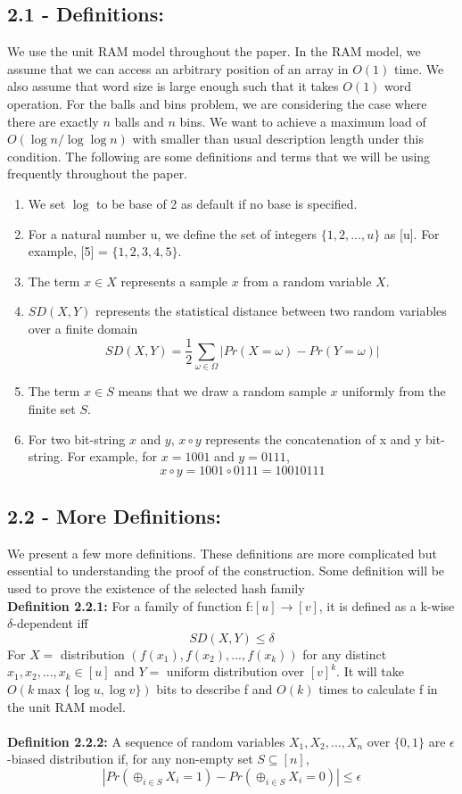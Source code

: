 \documentclass[a4paper, english]{paper}
\begin{document}
	\subsection{2.1 - Definitions:}
\quad	We use the unit RAM model throughout the paper. In the RAM model, we assume that we can access an arbitrary position of an array in $O(1)$ time. We also assume that word size is large enough such that it takes $O(1)$ word operation. For the balls and bins problem, we are considering the case where there are exactly $n$ balls and $n$ bins. We want to achieve a maximum load of $O(\log n/ \log \log n)$ with smaller than usual description length under this condition. The following are some definitions and terms that we will be using frequently throughout the paper.
	\begin{enumerate}
	\item We set $\log$ to be base of 2 as default if no base is specified. 
	\item For a natural number u, we define the set of integers $\{1, 2, ..., u\}$ as [u].  For example, [5] = $\{1,2,3,4,5\}$.
	\item The term $x \in X$ represents a sample $x$ from a random variable $X$.
	\item  $SD(X, Y)$ represents the statistical distance between two random variables over a finite domain
		$$SD(X, Y) = \frac{1}{2}\sum_{\omega\in \Omega}| Pr(X= \omega) - Pr(Y= \omega)|$$
	\item The term $x \in S$ means that we draw a random sample $x$ uniformly from the finite set $S$.
	\item For two bit-string $x$ and $y$, $x \circ y$ represents the concatenation of x and y bit-string. For example, for $x = 1001$ and $y = 0111$, 
		$$x \circ y = 1001 \circ 0111 = 10010111$$
	\end{enumerate}
	
	\subsection{2.2 - More Definitions:}
\quad	We present a few more definitions. These definitions are more complicated but essential to understanding the proof of the construction. Some definition will be used to prove the existence of the selected hash family \\
	
	\noindent\textbf{Definition 2.2.1:} 
	For a family of function f:$[u]\rightarrow[v]$, it is defined as  a k-wise $\delta$-dependent iff
		$$SD(X,Y)\le \delta$$
	For $X= $ distribution $(f(x_1),f(x_2),...,f(x_k))$ for any distinct $x_1,x_2,...,x_k\in[u]$ and $Y=$ uniform distribution over $[v]^k$.
	It will take $O(k\max\{\log u, \log v\})$ bits to describe f and $O(k)$ times to calculate f in the unit RAM model.\\\\
\textbf{Definition 2.2.2: }
	A sequence of random variables $X_1,X_2,...,X_n$ over $\{0,1\}$ are $\epsilon$-biased distribution if, for any non-empty set $S\subseteq [n]$,
	$$|Pr(\oplus_{i\in S} X_i = 1)-Pr(\oplus_{i\in S} X_i = 0)|\le \epsilon$$
	
\end{document}
